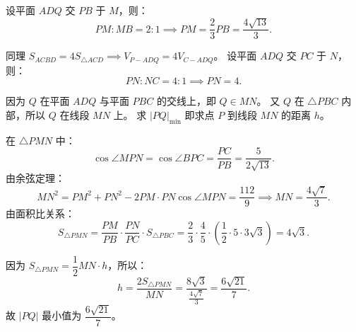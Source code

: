 {  设平面 \(ADQ\) 交 \(PB\) 于 \(M\)，则：
  \[
    PM : MB = 2 : 1 \implies PM = \frac{2}{3}PB = \frac{4\sqrt{13}}{3}.
  \]
  
  同理 \(S_{ACBD} = 4S_{\triangle ACD} \implies V_{P-ADQ} = 4V_{C-ADQ}\)。
  设平面 \(ADQ\) 交 \(PC\) 于 \(N\)，则：
  \[
    PN : NC = 4 : 1 \implies PN = 4.
  \]
  
  因为 \(Q\) 在平面 \(ADQ\) 与平面 \(PBC\) 的交线上，即 \(Q \in MN\)。
  又 \(Q\) 在 \(\triangle PBC\) 内部，所以 \(Q\) 在线段 \(MN\) 上。
  求 \(|PQ|_{\min}\) 即求点 \(P\) 到线段 \(MN\) 的距离 \(h\)。
  
  在 \(\triangle PMN\) 中：
  \[
    \cos\angle MPN = \cos\angle BPC = \frac{PC}{PB} = \frac{5}{2\sqrt{13}}.
  \]
  由余弦定理：
  \[
    MN^2 = PM^2 + PN^2 - 2PM \cdot PN \cos\angle MPN = \frac{112}{9} \implies MN = \frac{4\sqrt{7}}{3}.
  \]
  由面积比关系：
  \[
    S_{\triangle PMN} = \frac{PM}{PB} \cdot \frac{PN}{PC} \cdot S_{\triangle PBC} 
    = \frac{2}{3} \cdot \frac{4}{5} \cdot \left(\frac{1}{2} \cdot 5 \cdot 3\sqrt{3}\right) = 4\sqrt{3}.
  \]
  
  因为 \(S_{\triangle PMN} = \dfrac{1}{2}MN \cdot h\)，所以：
  \[
    h = \frac{2S_{\triangle PMN}}{MN} = \frac{8\sqrt{3}}{\frac{4\sqrt{7}}{3}} = \frac{6\sqrt{21}}{7}.
  \]
  故 \(|PQ|\) 最小值为 \(\dfrac{6\sqrt{21}}{7}\)。%
}
